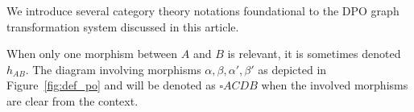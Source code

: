 We introduce several category theory notations foundational to the DPO graph transformation system discussed in this article.















 

 



\begin{remark}
    When only one morphism between \( A \) and \( B \) is relevant, it is sometimes denoted \( h_{AB} \). 
    The diagram involving morphisms \( \alpha, \beta, \alpha', \beta' \) as depicted in Figure~\ref{fig:def_po} and  will be denoted as 
     $\square ACDB$ when the involved morphisms are clear from the context.
\end{remark}  